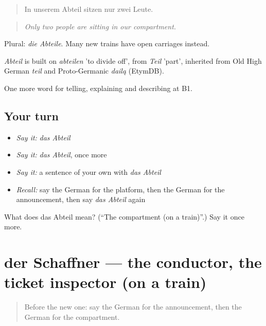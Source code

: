 \begin{quote}
In unserem Abteil sitzen nur zwei Leute.
\end{quote}

\begin{quote}
\emph{Only two people are sitting in our compartment.}
\end{quote}

Plural: \emph{die Abteile}. Many new trains have open carriages instead.

\begin{cousinweb}
\emph{Abteil} is built on \emph{abteilen} 'to divide off', from \emph{Teil} 'part', inherited from Old High German \emph{teil} and Proto-Germanic \emph{dailą} (EtymDB).
\end{cousinweb}

\begin{grammarlens}[title={What you've built}]
One more word for telling, explaining and describing at B1.
\end{grammarlens}

\subsection*{Your turn}
\begin{itemize}
\raggedright
  \item \emph{Say it:} \emph{das Abteil}
  \item \emph{Say it:} \emph{das Abteil}, once more
  \item \emph{Say it:} a sentence of your own with \emph{das Abteil}
  \item \emph{Recall:} say the German for the platform, then the German for the announcement, then say \emph{das Abteil} again
\end{itemize}

\begin{tcolorbox}[breakable,colback=teal!4,colframe=teal!35!black,title={Before you move on}]
What does das Abteil mean? (\textquotedblleft{}The compartment (on a train)\textquotedblright{}.) Say it once more.
\end{tcolorbox}
\section[der Schaffner]{der Schaffner — the conductor, the ticket inspector (on a train)}

\label{lesson:GE-C412-schaffner}



\begin{quote}
Before the new one: say the German for the announcement, then the German for the compartment.
\end{quote}

